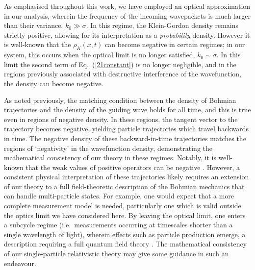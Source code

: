 \documentclass[
prx
,twocolumn
,nofootinbib
,floatfix
,superscriptaddress
]{revtex4-2}
\begin{document}
As emphasised throughout this work, we have employed an optical approximation in our analysis, wherein the frequency of the incoming wavepackets is much larger than their variance, $k_0 \gg \sigma$. In this regime, the Klein-Gordon density remains strictly positive, allowing for its interpretation as a \textit{probability} density. However it is well-known that the $\rho_K(x,t)$ can become negative in certain regimes; in our system, this occurs when the optical limit is no longer satisfied, $k_0 \sim \sigma$. In this limit the second term of Eq.\ (\ref{21constant}) is no longer negligible, and in the regions previously associated with destructive interference of the wavefunction, the density can become negative. 

As noted previously, the matching condition between the density of Bohmian trajectories and the density of the guiding wave holds for all time, and this is true even in regions of negative density. In these regions, the tangent vector to the trajectory becomes negative, yielding particle trajectories which travel backwards in time. The negative density of these backward-in-time trajectories matches the regions of `negativity' in the wavefunction density, demonstrating the mathematical consistency of our theory in these regimes. Notably, it is well-known that the weak values of positive operators can be negative \cite{puseyPhysRevLett.113.200401,Hosoya_2010,sokolovskiPhysRevA.76.042125,johansenPhysRevA.70.052115,aharonovPhysRevA.72.052111}. However, a consistent physical interpretation of these trajectories likely requires an extension of our theory to a full field-theoretic description of the Bohmian mechanics that can handle multi-particle states. For example, one would expect that a more complete measurement model is needed, particularly one which is valid outside the optics limit we have considered here. By leaving the optical limit, one enters a subcycle regime (i.e.\ measurements occurring at timescales shorter than a single wavelength of light), wherein effects such as particle production emerge, a description requiring a full quantum field theory \cite{Riek_2017}. The mathematical consistency of our single-particle relativistic theory may give some guidance in such an endeavour. 
\end{document}
